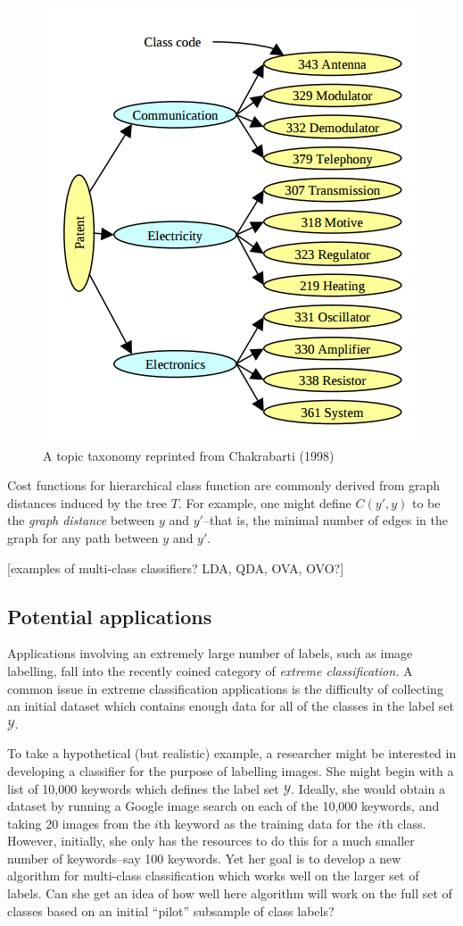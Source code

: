 \documentclass[12pt]{article}
\begin{document}
\begin{figure}[h]
\centering
\includegraphics[scale = 0.4]{chakrabarti_1998.png}
\caption{A topic taxonomy reprinted from Chakrabarti (1998)}\label{fig:chakra}
\end{figure}

Cost functions for hierarchical class function are commonly derived
from graph distances induced by the tree $T$.  For example, one might
define $C(y', y)$ to be the \emph{graph distance} between $y$ and
$y'$--that is, the minimal number of edges in the graph for any path
between $y$ and $y'$.

[examples of multi-class classifiers? LDA, QDA, OVA, OVO?]

\subsection{Potential applications}


Applications involving an extremely large number of labels, such as
image labelling, fall into the recently coined category
of \emph{extreme classification.}  A common issue in extreme
classification applications is the difficulty of collecting an initial
dataset which contains enough data for all of the classes in the label
set $\mathcal{Y}$.

To take a hypothetical (but realistic) example, a researcher might be
interested in developing a classifier for the purpose of labelling
images.  She might begin with a list of 10,000 keywords which defines
the label set $\mathcal{Y}$.  Ideally, she would obtain a dataset by
running a Google image search on each of the 10,000 keywords, and
taking 20 images from the $i$th keyword as the training data for the
$i$th class.  However, initially, she only has the resources to do
this for a much smaller number of keywords--say 100 keywords.  Yet her
goal is to develop a new algorithm for multi-class classification
which works well on the larger set of labels.  Can she get an idea of
how well here algorithm will work on the full set of classes based on
an initial ``pilot'' subsample of class labels?
\end{document}

